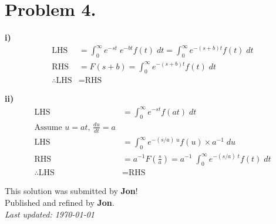 \documentclass[12pt]{article}
\begin{document}
	
	
	\section*{Problem 4.}
	\textbf{i)}
	$$
	\begin{aligned}
	\text{LHS}&=\int_{0}^{\infty}e^{-st}\;e^{-bt}f(t)\;dt=\int_{0}^{\infty}e^{-(s+b)t}f(t)\;dt\\
	\text{RHS}&=F(s+b)=\int_{0}^{\infty}e^{-(s+b)t}f(t)\;dt\\
	\therefore\text{LHS}&=\text{RHS}
	\end{aligned}
	$$

	\textbf{ii)}
	$$
	\begin{aligned}
		\text{LHS}&=\int_{0}^{\infty}e^{-st}f(at)\;dt\\
		\text{Assume } u=at\text{, }\frac{du}{dt}=a\\
		\text{LHS}&=\int_{0}^{\infty}e^{-(s/a)\;u}f(u)\times a^{-1}\;du\\
		\text{RHS}&=a^{-1}F(\frac{s}{a})=a^{-1}\;\int_{0}^{\infty}e^{-(s/a)\;t}f(t)\;dt\\
		\therefore \text{LHS}&=\text{RHS}
	\end{aligned}
	$$

	\newpage
	\thispagestyle{empty}
	
	\begin{center}
		This solution was submitted by \textbf{Jon}!\\[4pt]
		Published and refined by \textbf{Jon}.\\[8pt]
		\textit{Last updated: \today}
	\end{center}
	
\end{document}
